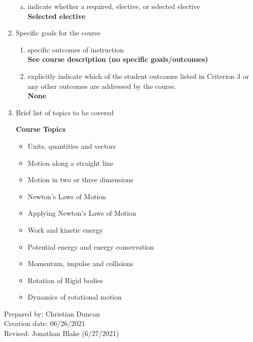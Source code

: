 \begin{enumerate}[1.]
\begin{enumerate}[a.]
\item indicate whether a required, elective, or selected elective\\ %
  {\bfseries
    Selected elective
  }

\end{enumerate}

\item Specific goals for the course
\begin{enumerate}
\item specific outcomes of instruction\\ %
  {\bfseries
    See course description (no specific goals/outcomes)
  }

\item explicitly indicate which of the student outcomes listed in Criterion 3 or any other outcomes are addressed by the course.\\
  {\bfseries
    None
  }
\end{enumerate}

\item Brief list of topics to be covered\\
  {\bfseries
    Course Topics
    \begin{itemize}
      \item Units, quantities and vectors
      \item Motion along a straight line
      \item Motion in two or three dimensions
      \item Newton’s Laws of Motion
      \item Applying Newton’s Laws of Motion
      \item Work and kinetic energy
      \item Potential energy and energy conservation
      \item Momentum, impulse and collisions
      \item Rotation of Rigid bodies
      \item Dynamics of rotational motion
    \end{itemize}
  }

\end{enumerate}

\noindent Prepared by: Christian Duncan\\
\noindent Creation date: 06/26/2021\\
\noindent Revised: Jonathan Blake (6/27/2021)\\
